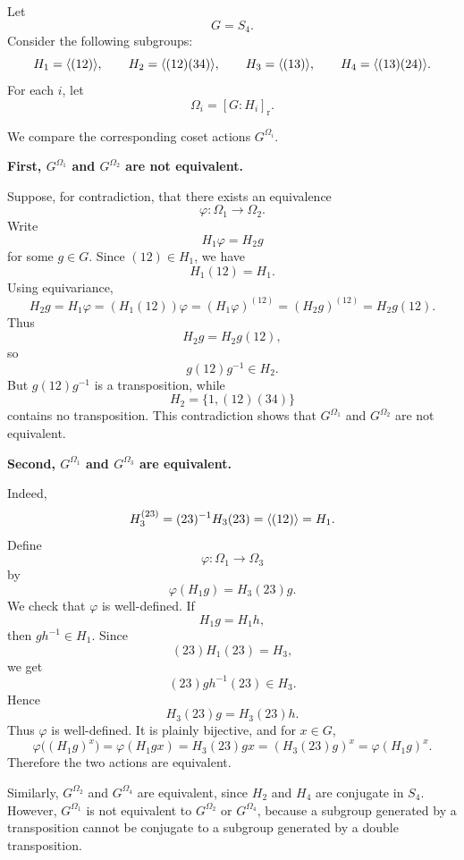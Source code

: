 \begin{example}
Let
\[
    G=S_4.
\]
Consider the following subgroups:
\[
    H_1=\langle (12)\rangle,\qquad
    H_2=\langle (12)(34)\rangle,\qquad
    H_3=\langle (13)\rangle,\qquad
    H_4=\langle (13)(24)\rangle.
\]
For each \(i\), let
\[
    \Omega_i=[G:H_i]_{\mathrm r}.
\]

We compare the corresponding coset actions \(G^{\Omega_i}\).

\medskip

\noindent
\textbf{First, \(G^{\Omega_1}\) and \(G^{\Omega_2}\) are not equivalent.}

Suppose, for contradiction, that there exists an equivalence
\[
    \varphi:\Omega_1\longrightarrow \Omega_2.
\]
Write
\[
    H_1\varphi=H_2g
\]
for some \(g\in G\). Since \((12)\in H_1\), we have
\[
    H_1(12)=H_1.
\]
Using equivariance,
\[
    H_2g
    =
    H_1\varphi
    =
    (H_1(12))\varphi
    =
    (H_1\varphi)^{(12)}
    =
    (H_2g)^{(12)}
    =
    H_2g(12).
\]
Thus
\[
    H_2g=H_2g(12),
\]
so
\[
    g(12)g^{-1}\in H_2.
\]
But \(g(12)g^{-1}\) is a transposition, while
\[
    H_2=\{1,(12)(34)\}
\]
contains no transposition. This contradiction shows that \(G^{\Omega_1}\) and \(G^{\Omega_2}\) are not equivalent.

\medskip

\noindent
\textbf{Second, \(G^{\Omega_1}\) and \(G^{\Omega_3}\) are equivalent.}

Indeed,
\[
    H_3^{(23)}
    =
    (23)^{-1}H_3(23)
    =
    \langle (12)\rangle
    =
    H_1.
\]
Define
\[
    \varphi:\Omega_1\longrightarrow \Omega_3
\]
by
\[
    \varphi(H_1g)=H_3(23)g.
\]
We check that \(\varphi\) is well-defined. If
\[
    H_1g=H_1h,
\]
then \(gh^{-1}\in H_1\). Since
\[
    (23)H_1(23)=H_3,
\]
we get
\[
    (23)gh^{-1}(23)\in H_3.
\]
Hence
\[
    H_3(23)g=H_3(23)h.
\]
Thus \(\varphi\) is well-defined. It is plainly bijective, and for \(x\in G\),
\[
    \varphi\bigl((H_1g)^x\bigr)
    =
    \varphi(H_1gx)
    =
    H_3(23)gx
    =
    (H_3(23)g)^x
    =
    \varphi(H_1g)^x.
\]
Therefore the two actions are equivalent.

\medskip

Similarly, \(G^{\Omega_2}\) and \(G^{\Omega_4}\) are equivalent, since \(H_2\) and \(H_4\) are conjugate in \(S_4\). However, \(G^{\Omega_1}\) is not equivalent to \(G^{\Omega_2}\) or \(G^{\Omega_4}\), because a subgroup generated by a transposition cannot be conjugate to a subgroup generated by a double transposition.
\end{example}

